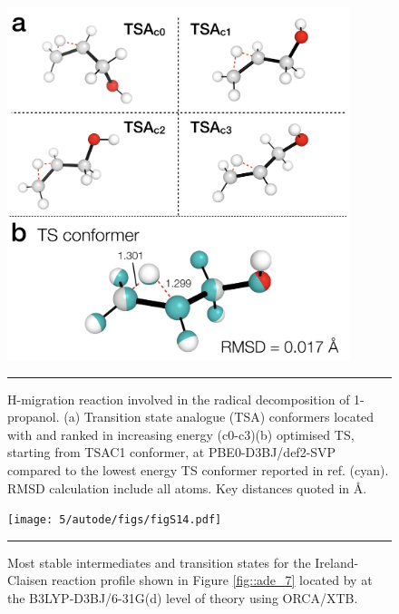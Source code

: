\documentclass[../../main.tex]{subfiles}
\begin{document}
\begin{figure}[h!]
	\vspace{0.4cm}
	\centering
	\includegraphics[width=10cm]{5/autode/figs/figS13}
	\vspace{0.4cm}
	\hrule
	\caption{H-migration reaction involved in the radical decomposition of 1-propanol. (a) Transition state analogue (TSA) conformers located with \ade and ranked in increasing energy (c0-c3)(b) optimised TS, starting from TSAC1 conformer, at PBE0-D3BJ/def2-SVP compared to the lowest energy TS conformer reported in ref. \cite{Ferro-Costas2018} (cyan). RMSD calculation include all atoms. Key distances quoted in \AA.}
	\label{fig::ade_si_13}
\end{figure}



\begin{figure}[h!]
	\vspace{0.4cm}
	\centering
	\texttt{[image: 5/autode/figs/figS14.pdf]}
	\vspace{0.4cm}
	\hrule
	\caption{Most stable intermediates and transition states for the Ireland-Claisen reaction profile shown in Figure \ref{fig::ade_7} located by \ade at the B3LYP-D3BJ/6-31G(d) level of theory using ORCA/XTB. }
	\label{fig::ade_si_14}
\end{figure}
\end{document}
